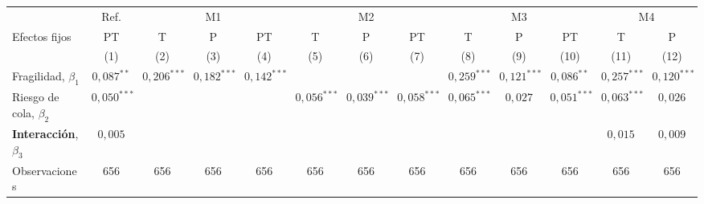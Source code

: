 \begingroup\setlength{\tabcolsep}{3pt}\renewcommand{\arraystretch}{1.3}%
\begin{adjustbox}{max width=0.97\textwidth}
\begin{tabular}{l c ccc ccc ccc cc}
\toprule
 & Ref. & \multicolumn{3}{c}{M1} & \multicolumn{3}{c}{M2} & \multicolumn{3}{c}{M3} & \multicolumn{2}{c}{M4} \\
\cmidrule(lr){2-2}\cmidrule(lr){3-5}\cmidrule(lr){6-8}\cmidrule(lr){9-11}\cmidrule(lr){12-13}
Efectos fijos & PT & T & P & PT & T & P & PT & T & P & PT & T & P \\
 & (1) & (2) & (3) & (4) & (5) & (6) & (7) & (8) & (9) & (10) & (11) & (12) \\
\midrule
Fragilidad, $\beta_1$ & $0{,}087^{**}$ & $0{,}206^{***}$ & $0{,}182^{***}$ & $0{,}142^{***}$ &  &  &  & $0{,}259^{***}$ & $0{,}121^{***}$ & $0{,}086^{**}$ & $0{,}257^{***}$ & $0{,}120^{***}$ \\
Riesgo de cola, $\beta_2$ & $0{,}050^{***}$ &  &  &  & $0{,}056^{***}$ & $0{,}039^{***}$ & $0{,}058^{***}$ & $0{,}065^{***}$ & $0{,}027$ & $0{,}051^{***}$ & $0{,}063^{***}$ & $0{,}026$ \\
\textbf{Interacción}, $\beta_3$ & $0{,}005$ &  &  &  &  &  &  &  &  &  & $0{,}015$ & $0{,}009$ \\
\addlinespace
Observaciones & 656 & 656 & 656 & 656 & 656 & 656 & 656 & 656 & 656 & 656 & 656 & 656 \\
\bottomrule
\end{tabular}
\end{adjustbox}\endgroup
